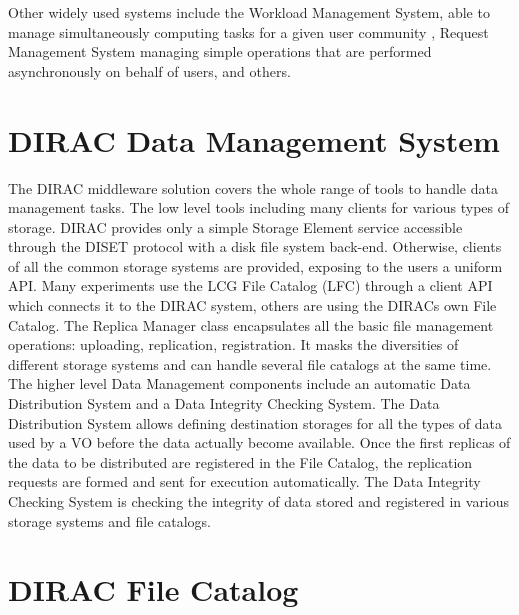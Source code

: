Other widely used systems include the Workload Management System, able to manage simultaneously computing
tasks for a given user community \cite{WMS}, Request Management System managing simple operations that 
are performed asynchronously on behalf of users, and others. 

\section{DIRAC Data Management System}

The DIRAC middleware solution covers the whole range of tools to handle data management tasks. The low level 
tools including many clients for various types of storage. DIRAC provides only a simple Storage Element service 
accessible through the DISET protocol with a disk file system back-end. Otherwise, clients of all 
the common storage systems are provided, exposing to the users a uniform API. Many experiments use the LCG
File Catalog (LFC) through a client API which connects it to the DIRAC system, others are using 
the DIRACs own File Catalog. The Replica Manager class encapsulates all the basic file 
management operations: uploading, replication, registration. It masks the diversities 
of different storage systems and can handle several file catalogs at the same time. 
The higher level Data Management components include an automatic Data Distribution System and
a Data Integrity Checking System. The Data Distribution System allows defining destination storages
for all the types of data used by a VO before the data actually become available. Once the first replicas
of the data to be distributed are registered in the File Catalog, the replication requests are formed and
sent for execution automatically. The Data Integrity Checking System is checking the integrity of data stored and
registered in various storage systems and file catalogs. 

\section{DIRAC File Catalog}

